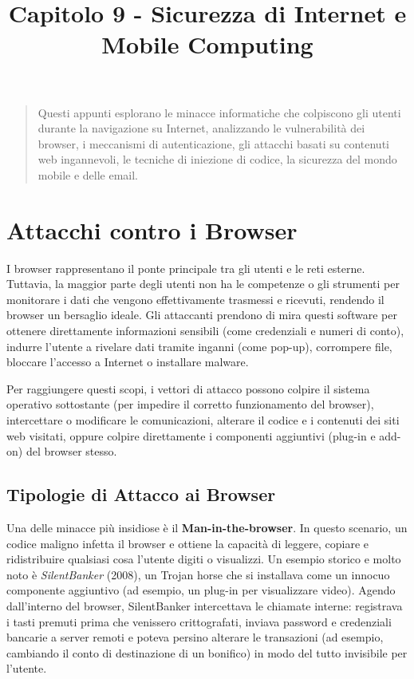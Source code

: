 \documentclass{article}
\title{Capitolo 9 - Sicurezza di Internet e Mobile Computing}
\author{}
\date{}
\begin{document}
\maketitle

\begin{quote}
    Questi appunti esplorano le minacce informatiche che colpiscono gli utenti durante la navigazione su Internet, analizzando le vulnerabilità dei browser, i meccanismi di autenticazione, gli attacchi basati su contenuti web ingannevoli, le tecniche di iniezione di codice, la sicurezza del mondo mobile e delle email.
\end{quote}

\vspace{0.8cm}

\section*{Attacchi contro i Browser}

I browser rappresentano il ponte principale tra gli utenti e le reti esterne. Tuttavia, la maggior parte degli utenti non ha le competenze o gli strumenti per monitorare i dati che vengono effettivamente trasmessi e ricevuti, rendendo il browser un bersaglio ideale. Gli attaccanti prendono di mira questi software per ottenere direttamente informazioni sensibili (come credenziali e numeri di conto), indurre l'utente a rivelare dati tramite inganni (come pop-up), corrompere file, bloccare l'accesso a Internet o installare malware.

Per raggiungere questi scopi, i vettori di attacco possono colpire il sistema operativo sottostante (per impedire il corretto funzionamento del browser), intercettare o modificare le comunicazioni, alterare il codice e i contenuti dei siti web visitati, oppure colpire direttamente i componenti aggiuntivi (plug-in e add-on) del browser stesso.

\subsection*{Tipologie di Attacco ai Browser}

Una delle minacce più insidiose è il \textbf{Man-in-the-browser}. In questo scenario, un codice maligno infetta il browser e ottiene la capacità di leggere, copiare e ridistribuire qualsiasi cosa l'utente digiti o visualizzi. Un esempio storico e molto noto è \textit{SilentBanker} (2008), un Trojan horse che si installava come un innocuo componente aggiuntivo (ad esempio, un plug-in per visualizzare video). Agendo dall'interno del browser, SilentBanker intercettava le chiamate interne: registrava i tasti premuti prima che venissero crittografati, inviava password e credenziali bancarie a server remoti e poteva persino alterare le transazioni (ad esempio, cambiando il conto di destinazione di un bonifico) in modo del tutto invisibile per l'utente.
\end{document}

